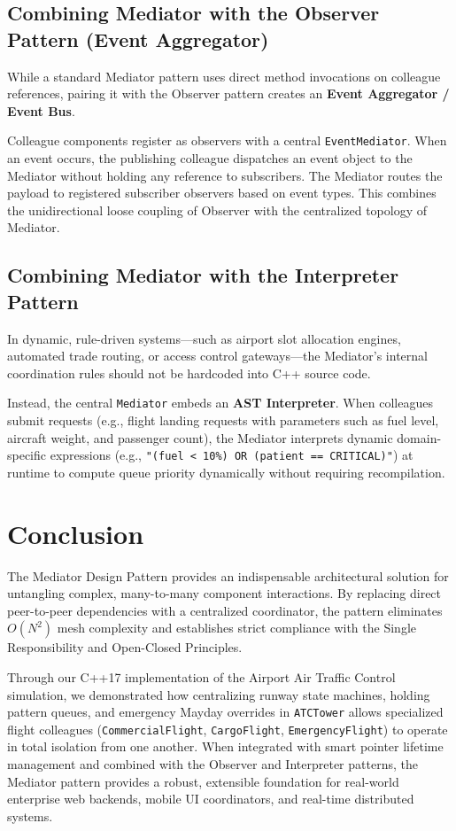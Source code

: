 \documentclass[12pt,a4paper]{article}
\begin{document}
\subsection{Combining Mediator with the Observer Pattern (Event Aggregator)}
While a standard Mediator pattern uses direct method invocations on colleague references, pairing it with the Observer pattern creates an \textbf{Event Aggregator / Event Bus}.

Colleague components register as observers with a central \texttt{EventMediator}. When an event occurs, the publishing colleague dispatches an event object to the Mediator without holding any reference to subscribers. The Mediator routes the payload to registered subscriber observers based on event types. This combines the unidirectional loose coupling of Observer with the centralized topology of Mediator.

\subsection{Combining Mediator with the Interpreter Pattern}
In dynamic, rule-driven systems—such as airport slot allocation engines, automated trade routing, or access control gateways—the Mediator's internal coordination rules should not be hardcoded into C++ source code.

Instead, the central \texttt{Mediator} embeds an \textbf{AST Interpreter}. When colleagues submit requests (e.g., flight landing requests with parameters such as fuel level, aircraft weight, and passenger count), the Mediator interprets dynamic domain-specific expressions (e.g., \texttt{"(fuel < 10\%) OR (patient == CRITICAL)"}) at runtime to compute queue priority dynamically without requiring recompilation.

\section{Conclusion}

The Mediator Design Pattern provides an indispensable architectural solution for untangling complex, many-to-many component interactions. By replacing direct peer-to-peer dependencies with a centralized coordinator, the pattern eliminates $O(N^2)$ mesh complexity and establishes strict compliance with the Single Responsibility and Open-Closed Principles.

Through our C++17 implementation of the Airport Air Traffic Control simulation, we demonstrated how centralizing runway state machines, holding pattern queues, and emergency Mayday overrides in \texttt{ATCTower} allows specialized flight colleagues (\texttt{CommercialFlight}, \texttt{CargoFlight}, \texttt{EmergencyFlight}) to operate in total isolation from one another. When integrated with smart pointer lifetime management and combined with the Observer and Interpreter patterns, the Mediator pattern provides a robust, extensible foundation for real-world enterprise web backends, mobile UI coordinators, and real-time distributed systems.
\end{document}
